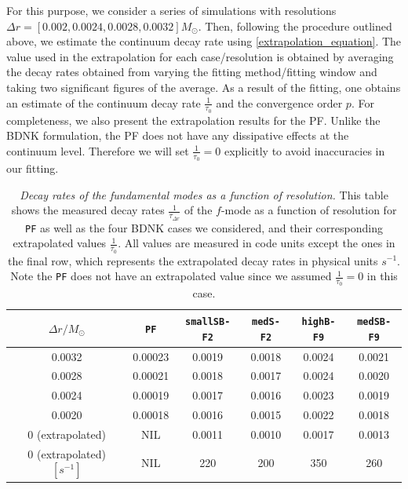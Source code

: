 \documentclass[prd,aps,twocolumn,floats,floatfix,nofootinbib,superscriptaddress] {revtex4-1}
\begin{document}
For this purpose, we consider a series of simulations with resolutions $\Delta r=[0.002,0.0024,0.0028,0.0032] M_\odot$. Then, following the  procedure outlined above, we estimate the continuum decay rate using \eqref{extrapolation_equation}.  The  value used in the extrapolation for each case/resolution is obtained by averaging the decay rates obtained from varying the fitting method/fitting window and taking two significant figures of the average.  As a result of the fitting, one obtains an estimate of the continuum decay rate $\frac{1}{\tau_0}$ and the convergence order $p$.  For completeness, we also present the extrapolation results for the PF.  Unlike the BDNK formulation, the PF does not have any dissipative effects at the continuum level.  Therefore we will set $\frac{1}{\tau_0}=0$ explicitly to avoid inaccuracies in our fitting.

\begin{table} 
\begin{ruledtabular}
\begin{tabular}{c || c c c c c} 
 $\Delta r/M_\odot$ & \texttt{PF} & \texttt{smallSB-F2} & \texttt{medS-F2} & \textbf{\texttt{highB-F9}} & \texttt{medSB-F9}\\ 
 [0.5ex] 
 \hline\hline
 0.0032 & 0.00023 & 0.0019 & 0.0018 & 0.0024 & 0.0021\\ 
 \hline
 0.0028 & 0.00021 & 0.0018 & 0.0017 & 0.0024 & 0.0020\\
 \hline
 0.0024 & 0.00019 & 0.0017 & 0.0016 & 0.0023 & 0.0019\\
 \hline
 0.0020 & 0.00018 & 0.0016 & 0.0015 & 0.0022 & 0.0018\\
 \hline
 0 (extrapolated) & NIL & 0.0011 & 0.0010 & 0.0017 & 0.0013\\
 \hline\hline
 0 (extrapolated)  $[s^{-1}]$ & NIL & 220 & 200 & 350 & 260\\
\end{tabular}
\caption{ {\em Decay rates of the fundamental modes as a function of resolution.}  This table shows the measured decay rates $\frac{1}{\tau_{\Delta r}}$ of the $f$-mode as a function of resolution for \texttt{PF} as well as the four BDNK cases we considered, and their corresponding extrapolated values $\frac{1}{\tau_0}$.  All values are measured in code units except the ones in the final row, which represents the extrapolated decay rates in physical units $s^{-1}$.  Note the \texttt{PF} does not have an extrapolated value since we assumed $\frac{1}{\tau_0}=0$ in this case.
}
\label{tab:QNM_table} 
\end{ruledtabular}
%
\end{table}
\end{document}
